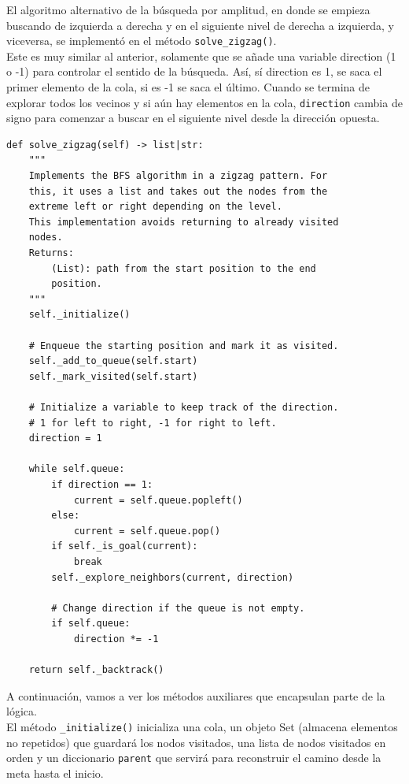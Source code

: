 \documentclass[12pt, letterpaper]{article}
\begin{document}
\clearpage
El algoritmo alternativo de la búsqueda por amplitud, en donde se empieza buscando de izquierda a derecha y en el siguiente nivel de derecha a izquierda, y viceversa, se implementó en el método \lstinline{solve_zigzag()}.
\\\newline
Este es muy similar al anterior, solamente que se añade una variable direction (1 o -1) para controlar el sentido de la búsqueda. Así, sí direction es 1, se saca el primer elemento de la cola, si es -1 se saca el último. Cuando se termina de explorar todos los vecinos y si aún hay elementos en la cola, \lstinline{direction} cambia de signo para comenzar a buscar en el siguiente nivel desde la dirección opuesta.
\clearpage
\begin{lstlisting}
def solve_zigzag(self) -> list|str:
    """
    Implements the BFS algorithm in a zigzag pattern. For
    this, it uses a list and takes out the nodes from the
    extreme left or right depending on the level.
    This implementation avoids returning to already visited
    nodes.
    Returns:
        (List): path from the start position to the end
        position.
    """
    self._initialize()

    # Enqueue the starting position and mark it as visited.
    self._add_to_queue(self.start)
    self._mark_visited(self.start)

    # Initialize a variable to keep track of the direction.
    # 1 for left to right, -1 for right to left.
    direction = 1

    while self.queue:
        if direction == 1:
            current = self.queue.popleft()
        else:
            current = self.queue.pop()
        if self._is_goal(current):
            break
        self._explore_neighbors(current, direction)

        # Change direction if the queue is not empty.
        if self.queue:
            direction *= -1

    return self._backtrack()
\end{lstlisting}
\clearpage
A continuación, vamos a ver los métodos auxiliares que encapsulan parte de la lógica.\\\newline
El método \lstinline{_initialize()} inicializa una cola, un objeto Set (almacena elementos no repetidos) que guardará los nodos visitados, una lista de nodos visitados en orden y un diccionario \lstinline{parent} que servirá para reconstruir el camino desde la meta hasta el inicio.\\
\end{document}

